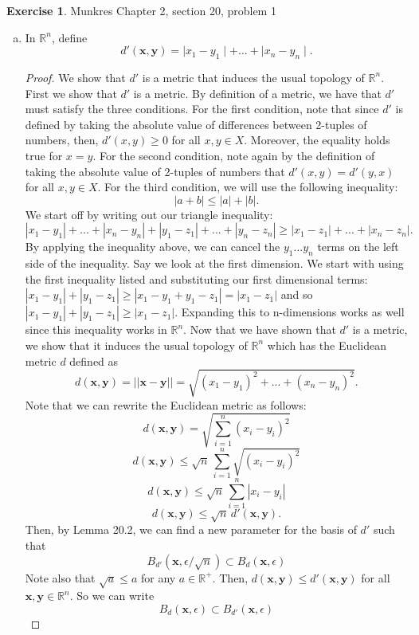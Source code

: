 \documentclass[12pt]{article}
\theoremstyle{definition}
\newtheorem{exercise}{Exercise}
\begin{document}
\begin{exercise} Munkres Chapter 2, section 20, problem 1 
\begin{enumerate}[(a)]
	\item In $\mathbb{R}^n$, define \[d'(\mathbf{x},\mathbf{y})=\mid x_1-y_1\mid +...+\mid x_n-y_n\mid.\] 
	\begin{proof}
		We show that $d'$ is a metric that induces the usual topology of $\mathbb{R}^n$. First we show that $d'$ is a metric. By definition of a metric, we have that $d'$ must satisfy the three conditions. For the first condition, note that since $d'$ is defined by taking the absolute value of differences between 2-tuples of numbers, then, $d'(x,y)\geq 0$ for all $x,y\in X$. Moreover, the equality holds true for $x=y$. For the second condition, note again by the definition of taking the absolute value of 2-tuples of numbers that $d'(x,y)=d'(y,x)$ for all $x,y\in X$. For the third condition, we will use the following inequality: \[|a+b|\leq |a|+|b|.\] We start off by writing out our triangle inequality: \[|x_1-y_1|+...+|x_n-y_n|+|y_1-z_1|+...+|y_n-z_n|\geq |x_1-z_1|+...+|x_n-z_n|.\] By applying the inequality above, we can cancel the $y_1...y_n$ terms on the left side of the inequality. Say we look at the first dimension. We start with using the first inequality listed and substituting our first dimensional terms: $|x_1-y_1|+|y_1-z_1|\geq |x_1-y_1+y_1-z_1|=|x_1-z_1|$ and so $|x_1-y_1|+|y_1-z_1|\geq |x_1-z_1|$. Expanding this to n-dimensions works as well since this inequality works in $\mathbb{R}^n$. \newline Now that we have shown that $d'$ is a metric, we show that it induces the usual topology of $\mathbb{R}^n$ which has the Euclidean metric $d$ defined as \[d(\mathbf{x},\mathbf{y})=||\mathbf{x}-\mathbf{y}||=\sqrt{(x_1-y_1)^2+...+(x_n-y_n)^2}.\] Note that we can rewrite the Euclidean metric as follows: \[d(\mathbf{x},\mathbf{y})=\sqrt{\sum_{i=1}^{n}(x_i-y_i)^2}\]
		\[d(\mathbf{x},\mathbf{y})\leq\sqrt{n}\,\sum_{i=1}^{n}\sqrt{(x_i-y_i)^2}\]
		\[d(\mathbf{x},\mathbf{y})\leq\sqrt{n}\,\sum_{i=1}^{n}|x_i-y_i|\]
		\[d(\mathbf{x},\mathbf{y})\leq\sqrt{n}\,d'(\mathbf{x},\mathbf{y}).\]
		Then, by Lemma 20.2, we can find a new parameter for the basis of $d'$ such that \[B_{d'}(\mathbf{x},\epsilon/\sqrt{n})\subset B_{d}(\mathbf{x},\epsilon)\]
		Note also that $\sqrt{a}\leq a$ for any $a\in\mathbb{R}^{+}$. Then, $d(\mathbf{x},\mathbf{y})\leq d'(\mathbf{x},\mathbf{y})$ for all $\mathbf{x},\mathbf{y}\in\mathbb{R}^{n}$. So we can write \[B_{d}(\mathbf{x},\epsilon)\subset B_{d'}(\mathbf{x},\epsilon)\] 

\end{proof}
\end{enumerate}
\end{exercise}
\end{document}
